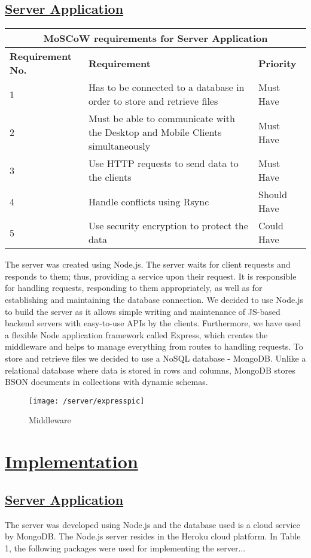 \documentclass{article}
\begin{document}
\subsection{\underline{Server Application}}

\begin{tabular}{|p{3cm}|p{5cm}|p{4cm}|}
\hline
\multicolumn{3}{|c|}{\textbf{MoSCoW requirements for Server Application}} \\
\hline
\textbf{Requirement No.} & \textbf{Requirement} & \textbf{Priority}\\
\hline
1 & Has to be connected to a database in order to store and retrieve files & Must Have \\
\hline
2 & Must be able to communicate with the Desktop and Mobile Clients simultaneously & Must Have \\
\hline
3 & Use HTTP requests to send data to the clients & Must Have \\
\hline
4 & Handle conflicts using Rsync & Should Have \\
\hline
5 & Use security encryption to protect the data & Could Have\\
\hline
\end{tabular}

The server was created using Node.js. The server waits for client requests and responds to them; thus, providing a service upon their request. It is responsible for handling requests, responding to them appropriately, as well as for establishing and maintaining the database connection.  We decided to use Node.js to build the server as it allows simple writing and maintenance of JS-based backend servers with easy-to-use APIs by the clients. Furthermore, we have used a flexible Node application framework called Express, which creates the middleware and helps to manage everything from routes to handling requests. To store and retrieve files we decided to use a NoSQL database - MongoDB. Unlike a relational database where data is stored in rows and columns, MongoDB stores BSON documents in collections with dynamic schemas.

\begin{figure}[h!]
\texttt{[image: /server/expresspic]}
\captionsetup{justification=centering}
\caption{Middleware}
\end{figure}

\section{\underline{Implementation}}
\subsection{\underline{Server Application}}
The server was developed using Node.js and the database used is a cloud service by MongoDB. The Node.js server resides in the Heroku cloud platform. In Table 1, the following packages were used for implementing the server... 
\end{document}
